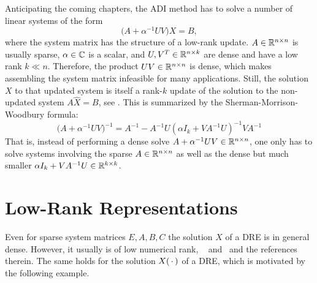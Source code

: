Anticipating the coming chapters,
the \ac{ADI} method has to solve a number of linear systems of the form
\begin{equation}
  \big(A + \alpha^{-1} UV \big) X = B
  ,
\end{equation}
where the system matrix has the structure of a low-rank update.
$A\in\mathbb{R}^{n\times n}$ is usually sparse,
$\alpha\in\mathbb{C}$ is a scalar,
and $U, V^T \in\mathbb{R}^{n\times k}$ are dense and have a low rank $k\ll n$.
Therefore, the product $UV \in\mathbb{R}^{n\times n}$ is dense,
which makes assembling the system matrix infeasible for many applications.
Still, the solution $X$ to that updated system is itself a rank-$k$ update of the solution to the non-updated system $A \hat X = B$,
see \eg \cite{Strang2016, Golub2013}.
This is summarized by the Sherman-Morrison-Woodbury formula:
\begin{equation}
  \big( A + \alpha^{-1}UV \big)^{-1} =
  A^{-1} - A^{-1} U (\alpha I_k + V A^{-1} U)^{-1} V A^{-1}
\end{equation}
That is, instead of performing a dense solve \wrt $A + \alpha^{-1} UV \in\mathbb{R}^{n\times n}$,
one only has to solve systems involving the sparse $A \in \mathbb{R}^{n\times n}$
as well as the dense but much smaller $\alpha I_k + VA^{-1} U \in\mathbb{R}^{k\times k}$.

\section{Low-Rank Representations}
\label{sec:lowrank}

Even for sparse system matrices $E, A, B, C$
the solution $X$ of a \ac{DRE} is in general dense.
However, it usually is of low numerical rank,
\cf \eg~\cite[Section~2.1.4]{Lang2017}
and~\cite[Sections~2.3.3 and~2.3.4]{Kuerschner2016}
and the references therein.
The same holds for the solution $X(\optional{})$ of a \ac{DRE},
which is motivated by the following example.

